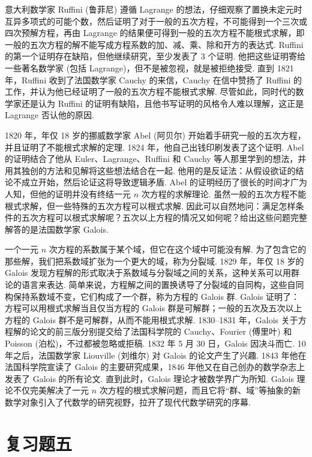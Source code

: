 \documentclass[UTF8,12pt,a4paper,fontset=fandol]{ctexart}
\begin{document}
意大利数学家 Ruffini (鲁菲尼) 遵循 Lagrange 的想法，仔细观察了置换未定元时互异多项式的可能个数，然后证明了对于一般的五次方程，不可能得到一个三次或四次预解方程，再由 Lagrange 的结果便可得到一般的五次方程不能根式求解，即一般的五次方程的解不能写成方程系数的加、减、乘、除和开方的表达式. Ruffini 的第一个证明存在缺陷，但他继续研究，至少发表了 3 个证明. 他把这些证明寄给一些著名数学家 (包括 Lagrange)，但不是被忽视，就是被拒绝接受. 直到 1821 年，Ruffini 收到了法国数学家 Cauchy 的来信，Cauchy 在信中赞扬了 Ruffini 的工作，并认为他已经证明了一般的五次方程不能根式求解. 尽管如此，同时代的数学家还是认为 Ruffini 的证明有缺陷，且他书写证明的风格令人难以理解，这正是 Lagrange 否认他的原因.

1820 年，年仅 18 岁的挪威数学家 Abel (阿贝尔) 开始着手研究一般的五次方程，并且证明了不能根式求解的定理. 1824 年，他自己出钱印刷发表了这个证明. Abel 的证明结合了他从 Euler、Lagrange、Ruffini 和 Cauchy 等人那里学到的想法，并用其独创的方法和见解将这些想法结合在一起. 他用的是反证法：从假设欲证的结论不成立开始，然后论证这将导致逻辑矛盾. Abel 的证明经历了很长的时间才广为人知，但他的证明并没有终结一元 $n$ 次方程的求解理论. 虽然一般的五次方程不能根式求解，但一些特殊的五次方程可以根式求解. 因此可以自然地问：满足怎样条件的五次方程可以根式求解呢？五次以上方程的情况又如何呢？给出这些问题完整解答的是法国数学家 Galois.

一个一元 $n$ 次方程的系数属于某个域，但它在这个域中可能没有解. 为了包含它的那些解，我们把系数域扩张为一个更大的域，称为分裂域. 1829 年，年仅 18 岁的 Galois 发现方程解的形式取决于系数域与分裂域之间的关系，这种关系可以用群论的语言来表达. 简单来说，方程解之间的置换诱导了分裂域的自同构，这些自同构保持系数域不变，它们构成了一个群，称为方程的 Galois 群. Galois 证明了：方程可以用根式求解当且仅当方程的 Galois 群是可解群；一般的五次及五次以上方程的 Galois 群不是可解群，从而不能用根式求解. 1830--1831 年，Galois 关于方程解的论文的前三版分别提交给了法国科学院的 Cauchy、Fourier (傅里叶) 和 Poisson (泊松)，不过都被忽略或拒稿. 1832 年 5 月 30 日，Galois 因决斗而亡. 10 年之后，法国数学家 Liouville (刘维尔) 对 Galois 的论文产生了兴趣. 1843 年他在法国科学院宣读了 Galois 的主要研究成果，1846 年他又在自己创办的数学杂志上发表了 Galois 的所有论文. 直到此时，Galois 理论才被数学界广为所知. Galois 理论不仅完美解决了一元 $n$ 次方程的根式求解问题，而且它将“群、域”等抽象的新数学对象引入了代数学的研究视野，拉开了现代代数学研究的序幕.

\section*{复习题五}
\end{document}
